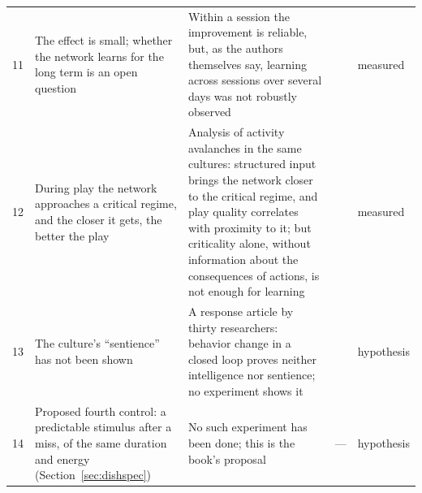 {\begin{longtable}{>{\raggedright}p{0.5cm}>{\raggedright}p{4.0cm}>{\raggedright}p{5.6cm}>{\raggedright}p{2.3cm}>{\raggedright\arraybackslash}p{1.7cm}}
11 & The effect is small; whether the network learns for the long term is an open question & Within a session the improvement is reliable, but, as the authors themselves say, learning across sessions over several days was not robustly observed & \cite{Kagan2022} & measured \\
12 & During play the network approaches a critical regime, and the closer it gets, the better the play & Analysis of activity avalanches in the same cultures: structured input brings the network closer to the critical regime, and play quality correlates with proximity to it; but criticality alone, without information about the consequences of actions, is not enough for learning & \cite{Habibollahi2023} & measured \\
13 & The culture's ``sentience'' has not been shown & A response article by thirty researchers: behavior change in a closed loop proves neither intelligence nor sentience; no experiment shows it & \cite{Balci2023} & hypothesis \\
14 & Proposed fourth control: a predictable stimulus after a miss, of the same duration and energy (Section~\ref{sec:dishspec}) & No such experiment has been done; this is the book's proposal & --- & hypothesis \\
\bottomrule
\end{longtable}}
